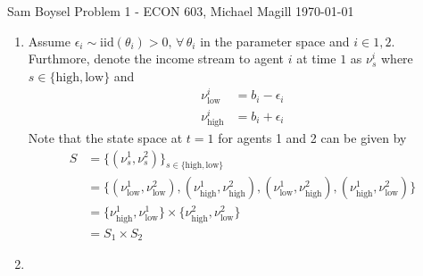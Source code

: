 \documentclass[12pt]{article}  %
\begin{document}
{\Large Sam Boysel} \hfill
{\large Problem 1 - ECON 603, Michael Magill}  %
\hfill  \today

\begin{enumerate}
	\item Assume \(\epsilon_i \sim \text{iid}(\theta_i) > 0, \, \forall \, 
		\theta_i\) in the parameter space and \(i \in 1, 2\).  Furthmore,
		denote the income stream to agent \(i\) at time \(1\) as
		\(\nu^{i}_{s}\) where \(s \in \{\text{high}, \text{low}\}\) and
		\begin{align*}
			\nu^{i}_{\text{low}} &= b_{i} - \epsilon_i \\
			\nu^{i}_{\text{high}} &= b_{i} + \epsilon_i
		\end{align*}
		Note that the state space at \(t = 1\) for agents 1 and 2 can 
		be given by
		\begin{align*}
		S &= \{(\nu^{1}_{s}, \nu^{2}_{s})\}_{s \in \{\text{high},
		\text{low}\}} \\
		&= \{(\nu^{1}_{\text{low}}, \nu^{2}_{\text{low}}),
		     (\nu^{1}_{\text{high}}, \nu^{2}_{\text{high}}),
	     	     (\nu^{1}_{\text{low}}, \nu^{2}_{\text{high}}),
	     	     (\nu^{1}_{\text{high}}, \nu^{2}_{\text{low}})\} \\
		     &= \{\nu^{1}_{\text{high}}, \nu^{1}_{\text{low}}\} \times 
	     		\{\nu^{2}_{\text{high}}, \nu^{2}_{\text{low}}\}	\\
		&= S_1 \times S_2
		\end{align*}
	\item 
\end{enumerate}
\end{document}
